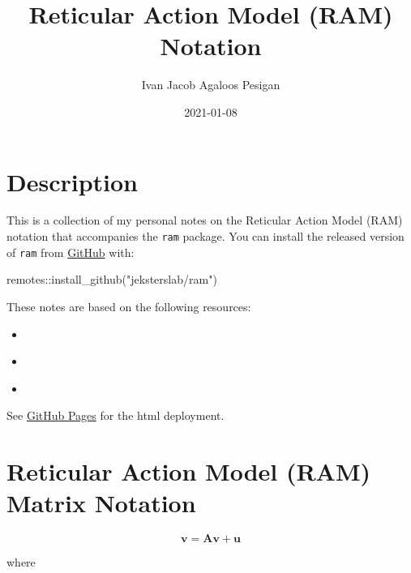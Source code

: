 \documentclass[
]{book}
\title{Reticular Action Model (RAM) Notation}
\author{Ivan Jacob Agaloos Pesigan}
\date{2021-01-08}
\newenvironment{Shaded}{\begin{snugshade}}{\end{snugshade}}
\newcommand{\FunctionTok}[1]{\textcolor[rgb]{0.00,0.00,0.00}{#1}}
\newcommand{\NormalTok}[1]{#1}
\newcommand{\SpecialCharTok}[1]{\textcolor[rgb]{0.00,0.00,0.00}{#1}}
\newcommand{\StringTok}[1]{\textcolor[rgb]{0.31,0.60,0.02}{#1}}
\providecommand{\tightlist}{%
  \setlength{\itemsep}{0pt}\setlength{\parskip}{0pt}}
\begin{document}
\maketitle

{
\setcounter{tocdepth}{1}
\tableofcontents
}
\hypertarget{description}{%
\chapter{Description}\label{description}}

This is a collection of my personal notes on the Reticular Action Model (RAM) notation
that accompanies the \texttt{ram} package.
You can install the released version of \texttt{ram} from \href{https://github.com/jeksterslab/ram}{GitHub} with:

\begin{Shaded}
\begin{Highlighting}[]
\NormalTok{remotes}\SpecialCharTok{::}\FunctionTok{install\_github}\NormalTok{(}\StringTok{"jeksterslab/ram"}\NormalTok{)}
\end{Highlighting}
\end{Shaded}

These notes are based on the following resources:

\begin{itemize}
\tightlist
\item
  \citet{Boker-2005}
\item
  \citet{McArdle-1984}
\item
  \citet{McArdle-2005}
\end{itemize}

See \href{https://jeksterslab.github.io/ram_notes/index.html}{GitHub Pages}
for the html deployment.

\hypertarget{ram-matrix-notation}{%
\chapter{Reticular Action Model (RAM) Matrix Notation}\label{ram-matrix-notation}}

\begin{equation}
  \mathbf{v}
  =
  \mathbf{A} \mathbf{v} + \mathbf{u}
\end{equation}

\noindent where
\end{document}
